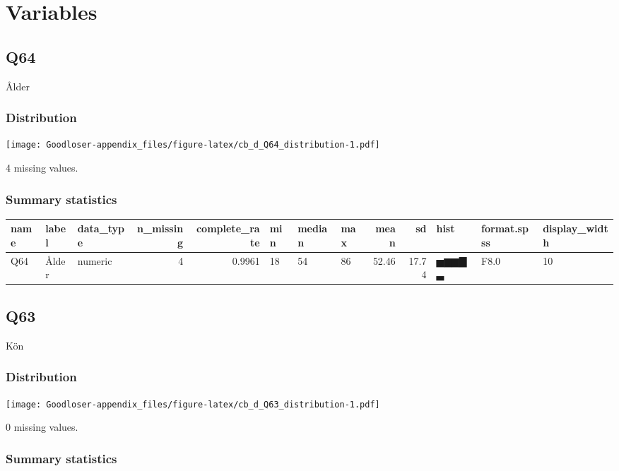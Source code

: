 \documentclass[
]{book}
\begin{document}
\hypertarget{variables}{%
\section{Variables}\label{variables}}

\hypertarget{Q64}{%
\subsection{Q64}\label{Q64}}

Ålder

\hypertarget{Q64_distribution}{%
\subsubsection{Distribution}\label{Q64_distribution}}

\texttt{[image: Goodloser-appendix\_files/figure-latex/cb\_d\_Q64\_distribution-1.pdf]}

4 missing values.

\hypertarget{Q64_summary}{%
\subsubsection{Summary statistics}\label{Q64_summary}}

\begin{tabular}{l|l|l|r|r|l|l|l|r|r|l|l|l}
\hline
name & label & data_type & n_missing & complete_rate & min & median & max & mean & sd & hist & format.spss & display_width\\
\hline
Q64 & Ålder & numeric & 4 & 0.9961 & 18 & 54 & 86 & 52.46 & 17.74 & ▅▆▆▇▃ & F8.0 & 10\\
\hline
\end{tabular}

\hypertarget{Q63}{%
\subsection{Q63}\label{Q63}}

Kön

\hypertarget{Q63_distribution}{%
\subsubsection{Distribution}\label{Q63_distribution}}

\texttt{[image: Goodloser-appendix\_files/figure-latex/cb\_d\_Q63\_distribution-1.pdf]}

0 missing values.

\hypertarget{Q63_summary}{%
\subsubsection{Summary statistics}\label{Q63_summary}}
\end{document}
